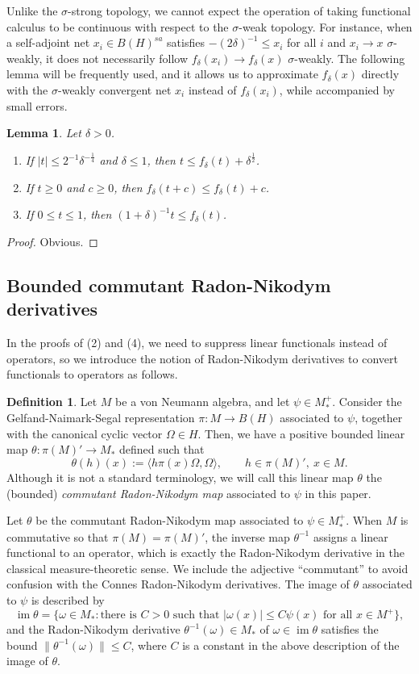 \documentclass[noamsfonts,a4paper,10pt]{amsart}
\theoremstyle{plain}
\newtheorem{lem}[thm]{Lemma}
\theoremstyle{definition}
\newtheorem{defn}[thm]{Definition}
\theoremstyle{remark}
\begin{document}
Unlike the $\sigma$-strong topology, we cannot expect the operation of taking functional calculus to be continuous with respect to the $\sigma$-weak topology.
For instance, when a self-adjoint net $x_i\in B(H)^{sa}$ satisfies $-(2\delta)^{-1}\le x_i$ for all $i$ and $x_i\to x$ $\sigma$-weakly, it does not necessarily follow $f_\delta(x_i)\to f_\delta(x)$ $\sigma$-weakly.
The following lemma will be frequently used, and it allows us to approximate $f_\delta(x)$ directly with the $\sigma$-weakly convergent net $x_i$ instead of $f_\delta(x_i)$, while accompanied by small errors.
\begin{lem}
Let $\delta>0$.
\begin{enumerate}
\item If $|t|\le2^{-1}\delta^{-\frac14}$ and $\delta\le1$, then $t\le f_\delta(t)+\delta^{\frac12}$.
\item If $t\ge0$ and $c\ge0$, then $f_\delta(t+c)\le f_\delta(t)+c$.
\item If $0\le t\le1$, then $(1+\delta)^{-1}t\le f_\delta(t)$.
\end{enumerate}
\end{lem}
\begin{proof}
Obvious.
\end{proof}

\subsection{Bounded commutant Radon-Nikodym derivatives}

In the proofs of (2) and (4), we need to suppress linear functionals instead of operators, so we introduce the notion of Radon-Nikodym derivatives to convert functionals to operators as follows.

\begin{defn}
Let $M$ be a von Neumann algebra, and let $\psi\in M_*^+$.
Consider the Gelfand-Naimark-Segal representation $\pi:M\to B(H)$ associated to $\psi$, together with the canonical cyclic vector $\Omega\in H$.
Then, we have a positive bounded linear map $\theta:\pi(M)'\to M_*$ defined such that
\[\theta(h)(x):=\langle h\pi(x)\Omega,\Omega\rangle,\qquad h\in\pi(M)',\ x\in M.\]
Although it is not a standard terminology, we will call this linear map $\theta$ the (bounded) \emph{commutant Radon-Nikodym map} associated to $\psi$ in this paper.
\end{defn}
Let $\theta$ be the commutant Radon-Nikodym map associated to $\psi\in M_*^+$.
When $M$ is commutative so that $\pi(M)=\pi(M)'$, the inverse map $\theta^{-1}$ assigns a linear functional to an operator, which is exactly the Radon-Nikodym derivative in the classical measure-theoretic sense.
We include the adjective ``commutant'' to avoid confusion with the Connes Radon-Nikodym derivatives.
The image of $\theta$ associated to $\psi$ is described by
\[\operatorname{im}\theta=\{\omega\in M_*:\text{there is $C>0$ such that $|\omega(x)|\le C\psi(x)$ for all $x\in M^+$}\},\]
and the Radon-Nikodym derivative $\theta^{-1}(\omega)\in M_*$ of $\omega\in\operatorname{im}\theta$ satisfies the bound $\|\theta^{-1}(\omega)\|\le C$, where $C$ is a constant in the above description of the image of $\theta$.
\end{document}
